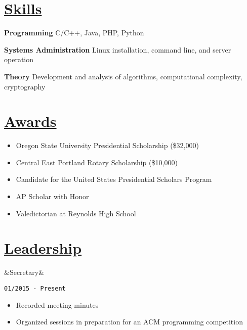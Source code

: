 \documentclass[11pt]{article}
\newcommand{\heading}[1]{
    \section*{\uline{\hfill #1}}
}
\newcommand{\squish}{
    \setlength{\itemsep}{0pt}
    \setlength{\parskip}{0pt}
    \setlength{\parsep}{0pt}
}
\newcommand{\when}[1]{
    \hfill \texttt{#1}%
}
\newcommand{\experience}[3]{
    \ifx&#2&
        \item[{#1}]
    \else
        \item[{#1}, \emph{#2}]
    \fi
    \when{#3}%
}
\newcommand{\skill}[2]{
    \textbf{#1} \hfill #2
}
\begin{document}
\heading{Skills}%

\skill{Programming}{C/C++, Java, PHP, Python}%

\skill{Systems Administration}{Linux installation, command line, and server operation}%

\skill{Theory}{Development and analysis of algorithms, computational complexity, cryptography}%

\heading{Awards}%
\begin{itemize}\squish
	\item Oregon State University Presidential Scholarship (\$32,000)
	\item Central East Portland Rotary Scholarship (\$10,000)
	\item Candidate for the United States Presidential Scholars Program
	\item AP Scholar with Honor
	\item Valedictorian at Reynolds High School
\end{itemize}
\heading{Leadership}%

\begin{description}
\squish
\experience{Oregon State University ACM Student Chapter}
	{Secretary}
	{01/2015 - Present}%
	\vspace*{-4pt}
	\begin{itemize} \squish
		\item Recorded meeting minutes
		\item Organized sessions in preparation for an ACM programming competition
	\end{itemize}
	
\end{description}
\end{document}
